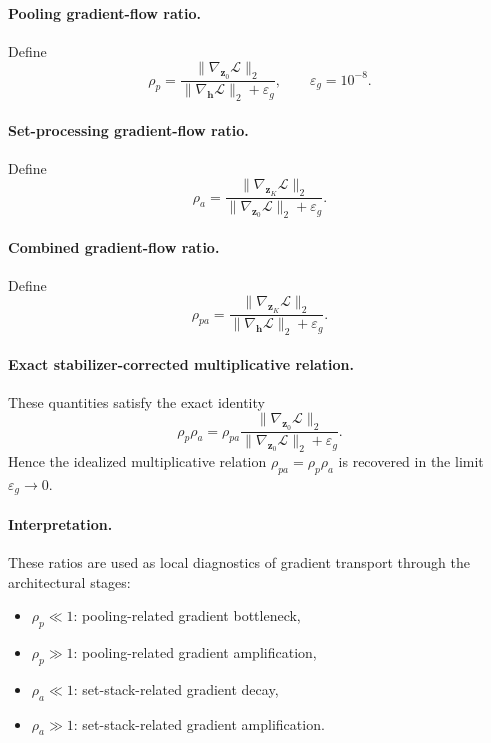 \documentclass{article}
\theoremstyle{plain}
\theoremstyle{definition}
\theoremstyle{remark}
\begin{document}
\paragraph{Pooling gradient-flow ratio.}
Define
\begin{equation}
\label{eq:rho-p}
\rho_p
=
\frac{\|\nabla_{\mathbf z_0}\mathcal L\|_2}{\|\nabla_{\mathbf h}\mathcal L\|_2+\varepsilon_g},
\qquad
\varepsilon_g=10^{-8}.
\end{equation}

\paragraph{Set-processing gradient-flow ratio.}
Define
\begin{equation}
\label{eq:rho-a}
\rho_a
=
\frac{\|\nabla_{\mathbf z_K}\mathcal L\|_2}{\|\nabla_{\mathbf z_0}\mathcal L\|_2+\varepsilon_g}.
\end{equation}

\paragraph{Combined gradient-flow ratio.}
Define
\begin{equation}
\label{eq:rho-pa}
\rho_{pa}
=
\frac{\|\nabla_{\mathbf z_K}\mathcal L\|_2}{\|\nabla_{\mathbf h}\mathcal L\|_2+\varepsilon_g}.
\end{equation}

\paragraph{Exact stabilizer-corrected multiplicative relation.}
These quantities satisfy the exact identity
\begin{equation}
\label{eq:rho-composition-corrected}
\rho_p\rho_a
=
\rho_{pa}
\frac{\|\nabla_{\mathbf z_0}\mathcal L\|_2}{\|\nabla_{\mathbf z_0}\mathcal L\|_2+\varepsilon_g}.
\end{equation}
Hence the idealized multiplicative relation $\rho_{pa}=\rho_p\rho_a$ is recovered in the limit $\varepsilon_g\to 0$.

\paragraph{Interpretation.}
These ratios are used as local diagnostics of gradient transport through the architectural stages:
\begin{itemize}
    \item $\rho_p\ll 1$: pooling-related gradient bottleneck,
    \item $\rho_p\gg 1$: pooling-related gradient amplification,
    \item $\rho_a\ll 1$: set-stack-related gradient decay,
    \item $\rho_a\gg 1$: set-stack-related gradient amplification.
\end{itemize}
\end{document}

